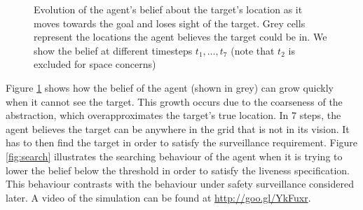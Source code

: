 \begin{figure}
\begin{minipage}{5.0cm}
{	}
	
\end{minipage}

	
	\caption{Evolution of the agent's belief about the target's location as it moves towards the goal and loses sight of the target. Grey cells represent the locations the agent believes the target could be in. We show the belief at different timesteps $t_1,\ldots,t_7$ (note that $t_2$ is excluded for space concerns)
		}
	\label{fig:case1exp}
	
\end{figure}

Figure \ref{fig:case1exp} shows how the belief of the agent (shown in grey) can grow quickly when it cannot see the target. This growth occurs due to the coarseness of the abstraction, which overapproximates the target's true location. In 7 steps, the agent believes the target can be anywhere in the grid that is not in its vision. It has to then find the target in order to satisfy the surveillance requirement. Figure \ref{fig:search} illustrates the searching behaviour of the agent when it is trying to lower the belief below the threshold in order to satisfy the liveness specification. This  behaviour contrasts with the behaviour under safety surveillance considered later. A video of the simulation can be found at \url{http://goo.gl/YkFuxr}.

